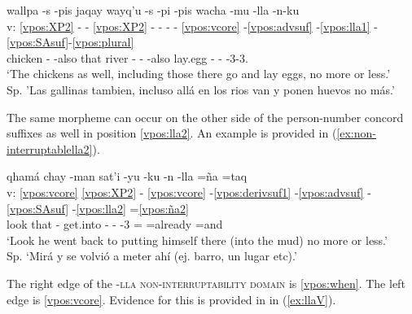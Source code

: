 \documentclass[output=paper]{langscibook}
\begin{document}
\ea \label{ex:non-interruptablella1}{
	\glll {} wallpa -s -pis jaqay wayq'u -s -pi -pis wacha -mu -lla -n-ku  \\
            v: \ref{vpos:XP2} - - \ref{vpos:XP2} - - - - \ref{vpos:vcore} -\ref{vpos:advsuf} -\ref{vpos:lla1} -\ref{vpos:SAsuf}-\ref{vpos:plural} \\
            {} chicken -\Pl{} -also that river -\Pl{} -\Loc{} -also lay.egg -\Mot{} -\Limit{} -3-3.\Pl{}  \\
	\glt ‘The chickens as well, including those there go and lay eggs, no more or less.' \\ Sp. 'Las gallinas tambien, incluso allá en los rios van y ponen huevos no más.' \hfill 
	}
\z

The same morpheme can occur on the other side of the person-number concord suffixes as well in position \ref{vpos:lla2}. An example is provided in (\ref{ex:non-interruptablella2}). 

\ea \label{ex:non-interruptablella2}{
	\glll {} qhamá chay -man sat'i -yu -ku -n -lla =ña =taq  \\
            v: \ref{vpos:vcore} \ref{vpos:XP2} - \ref{vpos:vcore} -\ref{vpos:derivsuf1} -\ref{vpos:advsuf} -\ref{vpos:SAsuf} -\ref{vpos:lla2} =\ref{vpos:ña2} {} \\
            {} look that -\All{} get.into -\Cmpl{} -\Refl{} -3\Sg{} =\Limit{} =already =and \\
	\glt `Look he went back to putting himself there (into the mud) no more or less.' \\ Sp. `Mirá y se volvió a meter ahí (ej. barro, un lugar etc).' \hfill 
	}
\z

The right edge of the \textsc{-lla non-interruptability domain} is \ref{vpos:when}. The left edge is \ref{vpos:vcore}. Evidence for this is provided in in (\ref{ex:llaV}).
\end{document}
